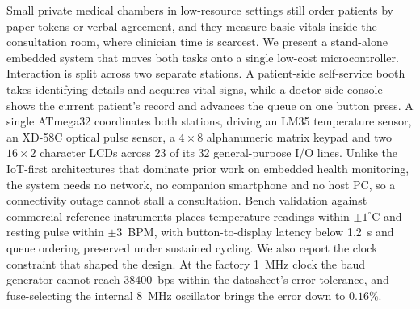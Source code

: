 Small private medical chambers in low-resource settings still order patients by paper
tokens or verbal agreement, and they measure basic vitals inside the consultation room,
where clinician time is scarcest. We present a stand-alone embedded system that moves both
tasks onto a single low-cost microcontroller. Interaction is split across two separate
stations. A patient-side self-service booth takes identifying details and acquires vital
signs, while a doctor-side console shows the current patient's record and advances the
queue on one button press. A single ATmega32 coordinates both stations, driving an LM35
temperature sensor, an XD-58C optical pulse sensor, a $4\times8$ alphanumeric matrix
keypad and two $16\times2$ character LCDs across 23 of its 32 general-purpose I/O lines.
Unlike the IoT-first architectures that dominate prior work on embedded health monitoring,
the system needs no network, no companion smartphone and no host PC, so a connectivity
outage cannot stall a consultation. Bench validation against commercial reference
instruments places temperature readings within $\pm 1^{\circ}$C and resting pulse within
$\pm 3$~BPM, with button-to-display latency below 1.2~s and queue ordering preserved under
sustained cycling. We also report the clock constraint that shaped the design. At the
factory 1~MHz clock the baud generator cannot reach 38400~bps within the datasheet's error
tolerance, and fuse-selecting the internal 8~MHz oscillator brings the error down to
$0.16\%$.
